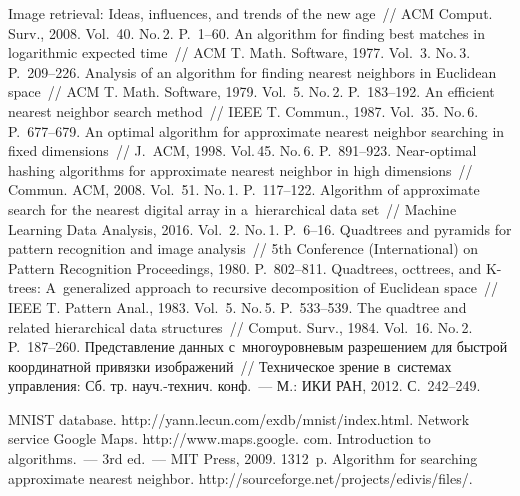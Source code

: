 \begin{multicols}{2}
 {\small\frenchspacing
 {%
 \begin{thebibliography}{99}
 Image retrieval: Ideas, influences, and trends of the new 
age~// ACM Comput. Surv., 2008. Vol.~40. No.\,2. P.~1--60.
 An algorithm for finding best matches in logarithmic 
expected time~// ACM T. Math. Software, 1977. Vol.~3. No.\,3. P.~209--226. 
 Analysis of an algorithm for finding nearest neighbors in Euclidean space~// ACM 
T. Math. Software, 1979. Vol.~5. No.\,2. P.~183--192. 
 An efficient nearest neighbor search method~// IEEE T. 
Commun., 1987. Vol.~35. No.\,6. P.~677--679. 
 An optimal algorithm for 
approximate nearest neighbor searching in fixed dimensions~// J.~ACM, 1998. Vol.\,45. No.\,6. 
P.~891--923.
 Near-optimal hashing algorithms for approximate nearest neighbor in 
high dimensions~// Commun.  ACM, 2008. Vol.~51. No.\,1. P.~117--122.
 Algorithm of approximate search for the 
nearest digital array in a~hierarchical data set~// Machine Learning Data Analysis, 2016. Vol.~2. 
No.\,1. P.~6--16. 
 Quadtrees and pyramids for pattern recognition and image analysis~// 5th  
Conference (International) on Pattern Recognition Proceedings, 1980. P.~802--811.
 Quadtrees, octtrees, and K-trees: A~generalized approach to 
recursive decomposition of Euclidean space~// IEEE T. Pattern Anal., 1983. Vol.~5. No.\,5.  
P.~533--539.
 The quadtree and related hierarchical data structures~// Comput. Surv., 1984. 
Vol.~16. No.\,2. P.~187--260.
 Представление данных с~многоуровневым разрешением 
для быстрой координатной привязки изображений~// Техническое зрение в~системах 
управления: Сб. тр. науч.-технич. конф.~---  М.: ИКИ РАН, 2012. С.~242--249.

\pagebreak

MNIST database. {\sf http://yann.lecun.com/exdb/mnist/\linebreak index.html}. 
Network service Google Maps. {\sf http://www.maps.google. com}.
 Introduction to algorithms.~--- 3rd ed.~--- MIT 
Press, 2009. 1312~p.
Algorithm for searching approximate nearest neighbor. {\sf 
http://sourceforge.net/projects/edivis/files/}.

 \end{thebibliography}

 }
 }

\end{multicols}

